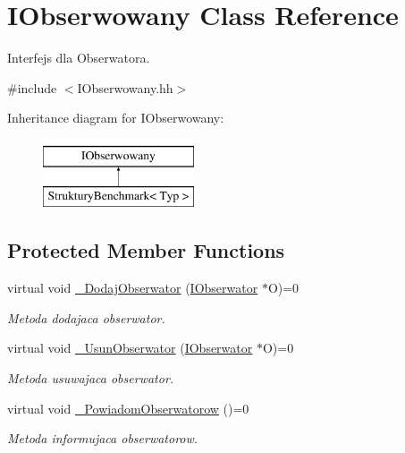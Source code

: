 \hypertarget{class_i_obserwowany}{\section{I\-Obserwowany Class Reference}
\label{class_i_obserwowany}
}


Interfejs dla Obserwatora.  




{\ttfamily \#include $<$I\-Obserwowany.\-hh$>$}

Inheritance diagram for I\-Obserwowany\-:\begin{figure}[H]
\begin{center}
\leavevmode
\includegraphics[height=2.000000cm]{class_i_obserwowany}
\end{center}
\end{figure}
\subsection*{Protected Member Functions}
\begin{DoxyCompactItemize}
\item 
virtual void \hyperlink{class_i_obserwowany_a3e7c49a1b168ed5a3f84bd0c5ae27513}{\-\_\-\-Dodaj\-Obserwator} (\hyperlink{class_i_obserwator}{I\-Obserwator} $\ast$O)=0
\begin{DoxyCompactList}\small\item\em Metoda dodajaca obserwator. \end{DoxyCompactList}\item 
virtual void \hyperlink{class_i_obserwowany_a6e91b84d0502f038d287152a5d860aff}{\-\_\-\-Usun\-Obserwator} (\hyperlink{class_i_obserwator}{I\-Obserwator} $\ast$O)=0
\begin{DoxyCompactList}\small\item\em Metoda usuwajaca obserwator. \end{DoxyCompactList}\item 
virtual void \hyperlink{class_i_obserwowany_addbe1bee0cae92b0c1348b2c6d0b525c}{\-\_\-\-Powiadom\-Obserwatorow} ()=0
\begin{DoxyCompactList}\small\item\em Metoda informujaca obserwatorow. \end{DoxyCompactList}\end{DoxyCompactItemize}


